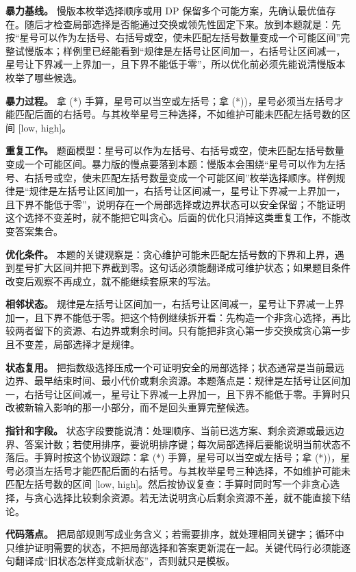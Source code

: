 \textbf{暴力基线。} 慢版本枚举选择顺序或用 DP 保留多个可能方案，先确认最优值存在。随后才检查局部选择是否能通过交换或领先性固定下来。放到本题就是：先按“星号可以作为左括号、右括号或空，使未匹配左括号数量变成一个可能区间”完整试慢版本；样例里已经能看到“规律是左括号让区间加一，右括号让区间减一，星号让下界减一上界加一，且下界不能低于零”，所以优化前必须先能说清慢版本枚举了哪些候选。

\textbf{暴力过程。} 拿 (*) 手算，星号可以当空或左括号；拿 (*))，星号必须当左括号才能匹配后面的右括号。与其枚举星号三种选择，不如维护可能未匹配左括号数的区间 [low, high]。

\textbf{重复工作。} 题面模型：星号可以作为左括号、右括号或空，使未匹配左括号数量变成一个可能区间。暴力版的慢点要落到本题：慢版本会围绕“星号可以作为左括号、右括号或空，使未匹配左括号数量变成一个可能区间”枚举选择顺序。样例规律是“规律是左括号让区间加一，右括号让区间减一，星号让下界减一上界加一，且下界不能低于零”，说明存在一个局部选择或边界状态可以安全保留；不能证明这个选择不变差时，就不能把它叫贪心。后面的优化只消掉这类重复工作，不能改变答案集合。

\textbf{优化条件。} 本题的关键观察是：贪心维护可能未匹配左括号数的下界和上界，遇到星号扩大区间并把下界截到零。这句话必须能翻译成可维护状态；如果题目条件改变后观察不再成立，就不能继续套原来的写法。

\textbf{相邻状态。} 规律是左括号让区间加一，右括号让区间减一，星号让下界减一上界加一，且下界不能低于零。把这个特例继续拆开看：先构造一个非贪心选择，再比较两者留下的资源、右边界或剩余时间。只有能把非贪心第一步交换成贪心第一步且不变差，局部选择才是规律。

\textbf{状态复用。} 把指数级选择压成一个可证明安全的局部选择；状态通常是当前最远边界、最早结束时间、最小代价或剩余资源。本题落点是：规律是左括号让区间加一，右括号让区间减一，星号让下界减一上界加一，且下界不能低于零。手算时只改被新输入影响的那一小部分，而不是回头重算完整候选。

\textbf{指针和字段。} 状态字段要能说清：处理顺序、当前已选方案、剩余资源或最远边界、答案计数；若使用排序，要说明排序键；每次局部选择后要能说明当前状态不落后。手算时按这个协议跟踪：拿 (*) 手算，星号可以当空或左括号；拿 (*))，星号必须当左括号才能匹配后面的右括号。与其枚举星号三种选择，不如维护可能未匹配左括号数的区间 [low, high]。然后按协议复查：手算时同时写一个非贪心选择，与贪心选择比较剩余资源。若无法说明贪心后剩余资源不差，就不能直接下结论。

\textbf{代码落点。} 把局部规则写成业务含义；若需要排序，就处理相同关键字；循环中只维护证明需要的状态，不把局部选择和答案更新混在一起。关键代码行必须能逐句翻译成“旧状态怎样变成新状态”，否则就只是模板。

